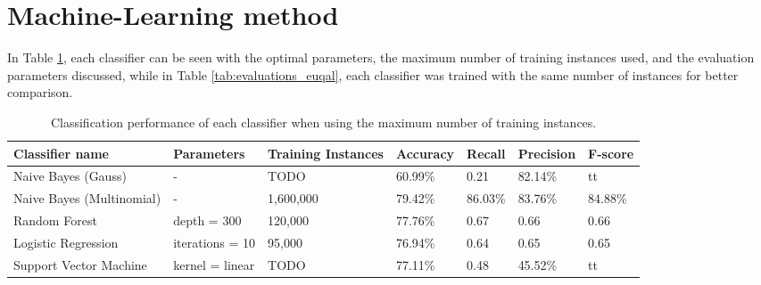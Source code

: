 \section{Machine-Learning method}
In Table \ref{tab:evaluations_max}, each classifier can be seen with the optimal parameters, the maximum number of training instances used, and the evaluation parameters discussed, while in Table \ref{tab:evaluations_euqal}, each classifier was trained with the same number of instances for better comparison.
\begin{table}[]
\centering
\caption{Classification performance of each classifier when using the maximum number of training instances.}
\begin{tabular}{ |p{3cm}||p{3cm}|p{2cm}|p{1.5cm}|p{1.5cm}|p{1.5cm}|p{1.5cm}| }
 \hline
 Classifier name &          Parameters &             Training Instances &    Accuracy &      Recall &     Precision& F-score \\
 \hline
 Naive Bayes (Gauss)        &-&            TODO&                 60.99\%&        0.21&       82.14\%& tt\\
  \hline
 Naive Bayes (Multinomial)  &-&                     1,600,000&                79.42\%&        86.03\%&       83.76\%& 84.88\%\\
  \hline
 Random Forest              &depth = 300&            120,000&                 77.76\%&        0.67&       0.66& 0.66\\
  \hline
 Logistic Regression        &iterations = 10&            95,000&                 76.94\%&        0.64&       0.65& 0.65\\
  \hline
 Support Vector Machine     &kernel = linear&            TODO&                 77.11\%&        0.48&       45.52\%& tt\\
 \hline
\end{tabular}
\label{tab:evaluations_max}
\end{table}


